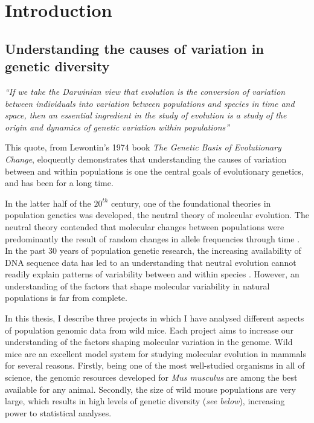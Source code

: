 \chapter{Introduction}

\section{Understanding the causes of variation in genetic diversity}

	\textit{``If we take the Darwinian view that evolution is the conversion of variation between individuals into variation between populations and species in time and space, then an essential ingredient in the study of evolution is a study of the origin and dynamics of genetic variation within populations''}\citep{RN183}

\noindent
This quote, from Lewontin's 1974 book \textit{The Genetic Basis of Evolutionary Change}, eloquently demonstrates that understanding the causes of variation between and within populations is one the central goals of evolutionary genetics, and has been for a long time.
	
	 In the latter half of the $20^{th}$ century, one of the foundational theories in population genetics was developed, the neutral theory of molecular evolution. The neutral theory contended that molecular changes between populations were predominantly the result of random changes in allele frequencies through time \citep{RN175}. In the past 30 years of population genetic research, the increasing availability of DNA sequence data has led to an understanding that neutral evolution cannot readily explain patterns of variability between and within species \citep{RN358}. However, an understanding of the factors that shape molecular variability in natural populations is far from complete.

	In this thesis, I describe three projects in which I have analysed different aspects of population genomic data from wild mice. Each project aims to increase our understanding of the factors shaping molecular variation in the genome. Wild mice are an excellent model system for studying molecular evolution in mammals for several reasons. Firstly, being one of the most well-studied organisms in all of science, the genomic resources developed for \textit{Mus musculus} are among the best available for any animal. Secondly, the size of wild mouse populations are very large, which results in high levels of genetic diversity (\textit{see below}), increasing power to statistical analyses. 

